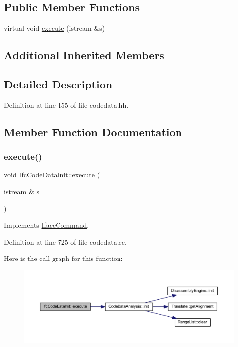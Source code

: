 \subsection*{Public Member Functions}
\begin{DoxyCompactItemize}
\item 
virtual void \mbox{\hyperlink{class_ifc_code_data_init_a24c369dc92e55a44cb58ff8105dfccbd}{execute}} (istream \&s)
\end{DoxyCompactItemize}
\subsection*{Additional Inherited Members}


\subsection{Detailed Description}


Definition at line 155 of file codedata.\+hh.



\subsection{Member Function Documentation}
\mbox{\label{class_ifc_code_data_init_a24c369dc92e55a44cb58ff8105dfccbd}} 
\subsubsection{\texorpdfstring{execute()}{execute()}}
{\footnotesize\ttfamily void Ifc\+Code\+Data\+Init\+::execute (\begin{DoxyParamCaption}\item[{istream \&}]{s }\end{DoxyParamCaption})\hspace{0.3cm}{\ttfamily [virtual]}}



Implements \mbox{\hyperlink{class_iface_command_af10e29cee2c8e419de6efe9e680ad201}{Iface\+Command}}.



Definition at line 725 of file codedata.\+cc.

Here is the call graph for this function\+:
\nopagebreak
\begin{figure}[H]
\begin{center}
\leavevmode
\includegraphics[width=350pt]{class_ifc_code_data_init_a24c369dc92e55a44cb58ff8105dfccbd_cgraph}
\end{center}
\end{figure}



